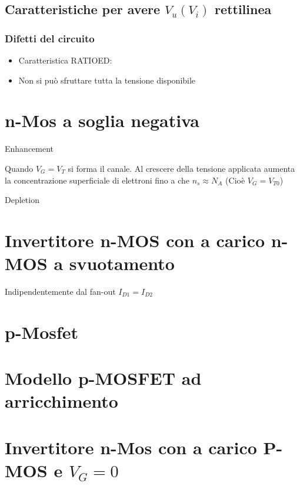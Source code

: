\documentclass{article}
\begin{document}
\subsection*{Caratteristiche per avere $V_u(V_i)$ rettilinea}

\subsubsection{Difetti del circuito}
\begin{itemize}
    \item Caratteristica RATIOED:
    \item Non si può sfruttare tutta la tensione disponibile
\end{itemize}


\section{n-Mos a soglia negativa}
\begin{minipage}{0.5\textwidth}
    \begin{center}
        Enhancement
    \end{center}
    Quando $V_G = V_T$ si forma il canale. Al crescere della tensione applicata aumenta la concentrazione superficiale di elettroni fino a che $n_s \approx N_A$ (Cioè $V_G = V_{T0}$)
\end{minipage}
\begin{minipage}{0.5\textwidth}
    \begin{center}
        Depletion
    \end{center}
\end{minipage}

\section{Invertitore n-MOS con a carico n-MOS a svuotamento}
Indipendentemente dal fan-out $I_{D1} = I_{D2}$

\section{p-Mosfet}
\section{Modello p-MOSFET ad arricchimento}
\section{Invertitore n-Mos con a carico P-MOS e $V_G = 0$}
\end{document}
